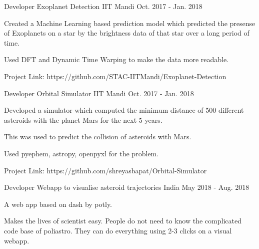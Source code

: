 \begin{cventries}


\cventry
{Developer} %
{Exoplanet Detection} %
{IIT Mandi} %
{Oct. 2017 - Jan. 2018} %
{ %
\begin{cvitems}
\item {Created a Machine Learning based prediction model which predicted the presense of Exoplanets on a star by the brightness data of that star over a long period of time.}
\item {Used DFT and Dynamic Time Warping to make the data more readable.}
\item {Project Link: https://github.com/STAC-IITMandi/Exoplanet-Detection}
\end{cvitems}
}


\cventry
{Developer} %
{Orbital Simulator} %
{IIT Mandi} %
{Oct. 2017 - Jan. 2018} %
{ %
\begin{cvitems}
\item {Developed a simulator which computed the minimum distance of 500 different asteroids with the planet Mars for the next 5 years.}
\item {This was used to predict the collision of asteroids with Mars.}
\item {Used pyephem, astropy, openpyxl for the problem.}
\item {Project Link: https://github.com/shreyasbapat/Orbital-Simulator}
\end{cvitems}
}


\cventry
{Developer} %
{Webapp to visualise asteroid trajectories} %
{India} %
{May 2018 - Aug. 2018} %
{ %
\begin{cvitems}
\item {A web app based on dash by potly.}
\item {Makes the lives of scientist easy. People do not need to know the complicated code base of poliastro. They can do everything using 2-3 clicks on a visual webapp.}
\end{cvitems}
}


\end{cventries}
